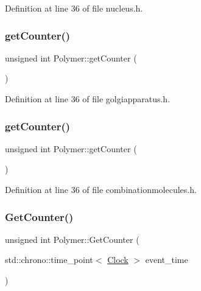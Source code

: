 Definition at line 36 of file nucleus.\+h.

\mbox{\label{class_polymer_a8346d821e5f8690d7816ba1d40036b69}} 
\subsubsection{\texorpdfstring{get\+Counter()}{getCounter()}\hspace{0.1cm}{\footnotesize\ttfamily [9/10]}}
{\footnotesize\ttfamily unsigned int Polymer\+::get\+Counter (\begin{DoxyParamCaption}{ }\end{DoxyParamCaption})\hspace{0.3cm}{\ttfamily [inline]}}



Definition at line 36 of file golgiapparatus.\+h.

\mbox{\label{class_polymer_a8346d821e5f8690d7816ba1d40036b69}} 
\subsubsection{\texorpdfstring{get\+Counter()}{getCounter()}\hspace{0.1cm}{\footnotesize\ttfamily [10/10]}}
{\footnotesize\ttfamily unsigned int Polymer\+::get\+Counter (\begin{DoxyParamCaption}{ }\end{DoxyParamCaption})\hspace{0.3cm}{\ttfamily [inline]}}



Definition at line 36 of file combinationmolecules.\+h.

\mbox{\label{class_polymer_ac33903f9b5d2c73d6ddadcb02ece323e}} 
\subsubsection{\texorpdfstring{Get\+Counter()}{GetCounter()}}
{\footnotesize\ttfamily unsigned int Polymer\+::\+Get\+Counter (\begin{DoxyParamCaption}\item[{std\+::chrono\+::time\+\_\+point$<$ \mbox{\hyperlink{universe_8h_a0ef8d951d1ca5ab3cfaf7ab4c7a6fd80}{Clock}} $>$}]{event\+\_\+time }\end{DoxyParamCaption})\hspace{0.3cm}{\ttfamily [inline]}}



